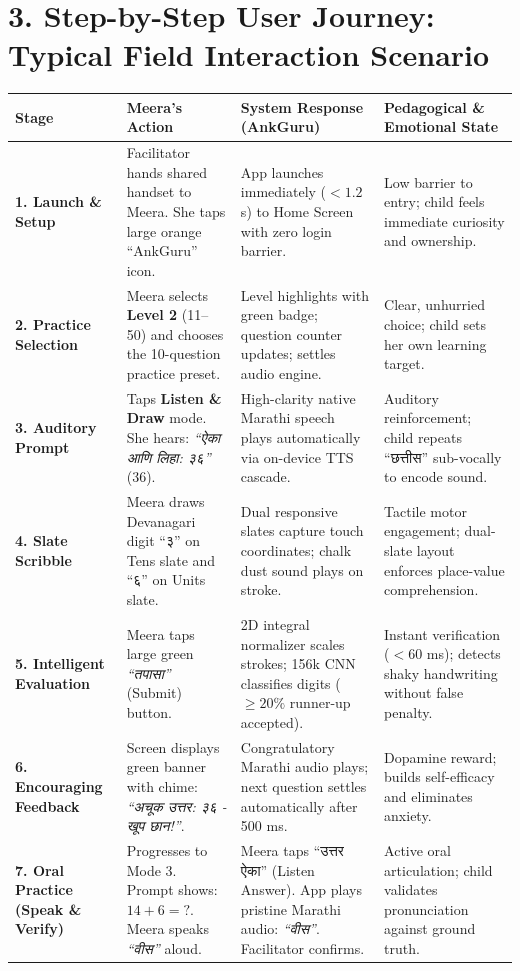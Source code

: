 \documentclass[10pt,a4paper]{article}
\begin{document}
\vspace{-3pt}
\section*{3. Step-by-Step User Journey: Typical Field Interaction Scenario}

\begin{table}[h!]
\centering
\scriptsize
\renewcommand{\arraystretch}{1.14}
\begin{tabularx}{\textwidth}{@{}p{1.9cm} p{2.9cm} p{4.5cm} X@{}}
\toprule
\rowcolor{primary!10}
\textbf{Stage} & \textbf{Meera's Action} & \textbf{System Response (AnkGuru)} & \textbf{Pedagogical \& Emotional State} \\
\midrule
\textbf{1. Launch \& Setup} & Facilitator hands shared handset to Meera. She taps large orange ``AnkGuru'' icon. & App launches immediately ($<1.2$s) to Home Screen with zero login barrier. & Low barrier to entry; child feels immediate curiosity and ownership. \\
\textbf{2. Practice Selection} & Meera selects \textbf{Level 2} (11--50) and chooses the 10-question practice preset. & Level highlights with green badge; question counter updates; settles audio engine. & Clear, unhurried choice; child sets her own learning target. \\
\textbf{3. Auditory Prompt} & Taps \textbf{Listen \& Draw} mode. She hears: \textit{``ऐका आणि लिहा: ३६''} (36). & High-clarity native Marathi speech plays automatically via on-device TTS cascade. & Auditory reinforcement; child repeats ``छत्तीस'' sub-vocally to encode sound. \\
\textbf{4. Slate Scribble} & Meera draws Devanagari digit ``३'' on Tens slate and ``६'' on Units slate. & Dual responsive slates capture touch coordinates; chalk dust sound plays on stroke. & Tactile motor engagement; dual-slate layout enforces place-value comprehension. \\
\textbf{5. Intelligent Evaluation} & Meera taps large green \textit{``तपासा''} (Submit) button. & 2D integral normalizer scales strokes; 156k CNN classifies digits ($\ge 20\%$ runner-up accepted). & Instant verification ($<60$ ms); detects shaky handwriting without false penalty. \\
\textbf{6. Encouraging Feedback} & Screen displays green banner with chime: \textit{``अचूक उत्तर: ३६ - खूप छान!''}. & Congratulatory Marathi audio plays; next question settles automatically after 500 ms. & Dopamine reward; builds self-efficacy and eliminates anxiety. \\
\textbf{7. Oral Practice (Speak \& Verify)} & Progresses to Mode 3. Prompt shows: $14 + 6 = ?$. Meera speaks \textit{``वीस''} aloud. & Meera taps ``उत्तर ऐका'' (Listen Answer). App plays pristine Marathi audio: \textit{``वीस''}. Facilitator confirms. & Active oral articulation; child validates pronunciation against ground truth. \\
\bottomrule
\end{tabularx}
\end{table}
\end{document}

